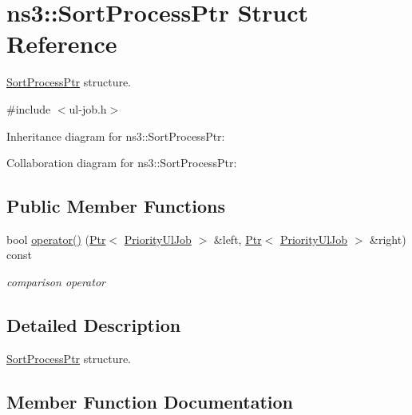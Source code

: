 \hypertarget{structns3_1_1SortProcessPtr}{}\section{ns3\+:\+:Sort\+Process\+Ptr Struct Reference}
\label{structns3_1_1SortProcessPtr}


\hyperlink{structns3_1_1SortProcessPtr}{Sort\+Process\+Ptr} structure.  




{\ttfamily \#include $<$ul-\/job.\+h$>$}



Inheritance diagram for ns3\+:\+:Sort\+Process\+Ptr\+:


Collaboration diagram for ns3\+:\+:Sort\+Process\+Ptr\+:
\subsection*{Public Member Functions}
\begin{DoxyCompactItemize}
\item 
bool \hyperlink{structns3_1_1SortProcessPtr_a3abba598e754f4da13d115179672176f}{operator()} (\hyperlink{classns3_1_1Ptr}{Ptr}$<$ \hyperlink{classns3_1_1PriorityUlJob}{Priority\+Ul\+Job} $>$ \&left, \hyperlink{classns3_1_1Ptr}{Ptr}$<$ \hyperlink{classns3_1_1PriorityUlJob}{Priority\+Ul\+Job} $>$ \&right) const 
\begin{DoxyCompactList}\small\item\em comparison operator \end{DoxyCompactList}\end{DoxyCompactItemize}


\subsection{Detailed Description}
\hyperlink{structns3_1_1SortProcessPtr}{Sort\+Process\+Ptr} structure. 

\subsection{Member Function Documentation}
